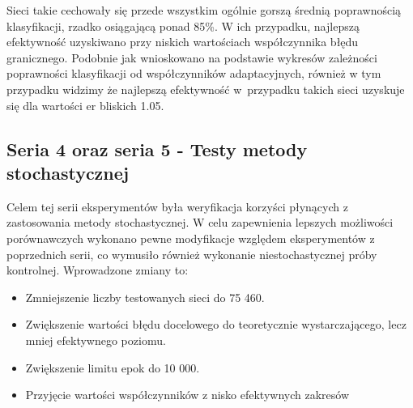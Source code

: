 \documentclass[12pt,twoside]{article}
\begin{document}
Sieci takie cechowały się przede wszystkim ogólnie gorszą średnią poprawnością klasyfikacji, rzadko osiągającą ponad 85\%.
W ich przypadku, najlepszą efektywność uzyskiwano przy niskich wartościach współczynnika błędu granicznego.
Podobnie jak wnioskowano na podstawie wykresów zależności poprawności klasyfikacji od współczynników adaptacyjnych,
również w tym przypadku widzimy że najlepszą efektywność w~przypadku takich sieci uzyskuje się dla wartości er bliskich 1.05.

\clearpage

\subsection{Seria 4 oraz seria 5 - Testy metody stochastycznej}
Celem tej serii eksperymentów była weryfikacja korzyści płynących z zastosowania metody stochastycznej.
W celu zapewnienia lepszych możliwości porównawczych wykonano pewne modyfikacje względem eksperymentów z poprzednich serii, co wymusiło również wykonanie niestochastycznej próby kontrolnej.
Wprowadzone zmiany to:
\begin{itemize}
	\item Zmniejszenie liczby testowanych sieci do 75 460.
	\item Zwiększenie wartości błędu docelowego do teoretycznie wystarczającego, lecz mniej efektywnego poziomu.
	\item Zwiększenie limitu epok do 10 000.
	\item Przyjęcie wartości współczynników z nisko efektywnych zakresów
\end{itemize}
\end{document}

